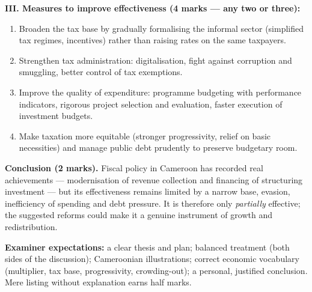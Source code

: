\documentclass[11pt]{article}
\begin{document}
\begin{corrige}
\textbf{III. Measures to improve effectiveness (4 marks — any two or three):}
\begin{enumerate}
\item Broaden the tax base by gradually formalising the informal sector (simplified tax regimes, incentives) rather than raising rates on the same taxpayers.
\item Strengthen tax administration: digitalisation, fight against corruption and smuggling, better control of tax exemptions.
\item Improve the quality of expenditure: programme budgeting with performance indicators, rigorous project selection and evaluation, faster execution of investment budgets.
\item Make taxation more equitable (stronger progressivity, relief on basic necessities) and manage public debt prudently to preserve budgetary room.
\end{enumerate}

\textbf{Conclusion (2 marks).} Fiscal policy in Cameroon has recorded real achievements — modernisation of revenue collection and financing of structuring investment — but its effectiveness remains limited by a narrow base, evasion, inefficiency of spending and debt pressure. It is therefore only \emph{partially} effective; the suggested reforms could make it a genuine instrument of growth and redistribution.

\textbf{Examiner expectations:} a clear thesis and plan; balanced treatment (both sides of the discussion); Cameroonian illustrations; correct economic vocabulary (multiplier, tax base, progressivity, crowding-out); a personal, justified conclusion. Mere listing without explanation earns half marks.
\end{corrige}
\end{document}
